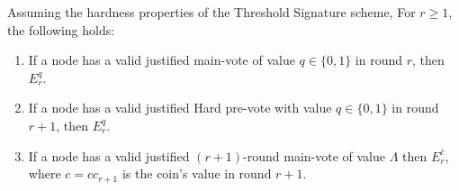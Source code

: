 \begin{lem}
  \label{lem-ba-prop}
  Assuming the hardness properties of the Threshold Signature scheme, For $r
  \geq 1$, the following holds:
  \begin{enumerate}
    \item If a node has a valid justified main-vote of value $q \in
      \{0,1\}$ in round $r$, then $E_r^q$.
    \item If a node has a valid justified Hard pre-vote with value
      $q \in \{0,1\}$ in round $r+1$, then $E_r^q$.
    \item If a node has a valid justified $(r+1)$-round main-vote of value
      $\Lambda$ then $E_r^{\bar{c}}$, where $c = {cc}_{r+1}$ is the coin's value
      in round $r+1$.
  \end{enumerate}
\end{lem}
